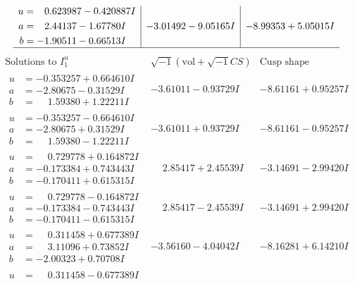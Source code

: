 \documentclass[1p]{elsarticle_modified}
\theoremstyle{definition}
\newcommand{\I}{\sqrt{-1}}
\begin{document}
$$\begin{array}{c|c|c}
\begin{aligned}
u &= \phantom{-}0.623987 - 0.420887 I \\
a &= \phantom{-}2.44137 - 1.67780 I \\
b &= -1.90511 - 0.66513 I\end{aligned}
 & -3.01492 - 9.05165 I & -8.99353 + 5.05015 I\\
 \hline 
 \end{array}$$\newpage$$\begin{array}{c|c|c}  
\text{Solutions to }I^u_{1}& \I (\text{vol} + \sqrt{-1}CS) & \text{Cusp shape}\\
 \hline 
\begin{aligned}
u &= -0.353257 + 0.664610 I \\
a &= -2.80675 - 0.31529 I \\
b &= \phantom{-}1.59380 + 1.22211 I\end{aligned}
 & -3.61011 - 0.93729 I & -8.61161 + 0.95257 I \\ \hline\begin{aligned}
u &= -0.353257 - 0.664610 I \\
a &= -2.80675 + 0.31529 I \\
b &= \phantom{-}1.59380 - 1.22211 I\end{aligned}
 & -3.61011 + 0.93729 I & -8.61161 - 0.95257 I \\ \hline\begin{aligned}
u &= \phantom{-}0.729778 + 0.164872 I \\
a &= -0.173384 + 0.743443 I \\
b &= -0.170411 + 0.615315 I\end{aligned}
 & \phantom{-}2.85417 + 2.45539 I & -3.14691 - 2.99420 I \\ \hline\begin{aligned}
u &= \phantom{-}0.729778 - 0.164872 I \\
a &= -0.173384 - 0.743443 I \\
b &= -0.170411 - 0.615315 I\end{aligned}
 & \phantom{-}2.85417 - 2.45539 I & -3.14691 + 2.99420 I \\ \hline\begin{aligned}
u &= \phantom{-}0.311458 + 0.677389 I \\
a &= \phantom{-}3.11096 + 0.73852 I \\
b &= -2.00323 + 0.70708 I\end{aligned}
 & -3.56160 - 4.04042 I & -8.16281 + 6.14210 I \\ \hline\begin{aligned}
u &= \phantom{-}0.311458 - 0.677389 I \\

\end{aligned}
\end{array}$$
\end{document}
